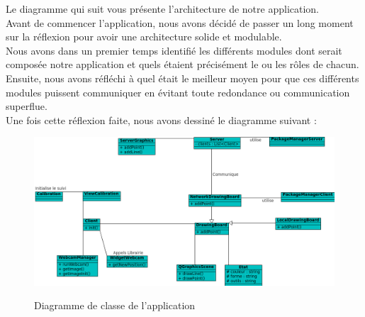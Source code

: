 \documentclass{report}
\begin{document}
				\newpage			
				Le diagramme qui suit vous présente l'architecture de notre application. \\
Avant de commencer l'application, nous avons décidé de passer un long moment sur la réflexion pour avoir une architecture solide et modulable.\\Nous avons dans un premier temps identifié les différents modules dont serait composée notre application et quels étaient précisément le ou les rôles de chacun. \\Ensuite, nous avons réfléchi à quel était le meilleur moyen pour que ces différents modules puissent communiquer en évitant toute redondance ou communication superflue. \\Une fois cette réflexion faite, nous avons dessiné le diagramme suivant : \\
				\begin{figure}[!h]
						\centering
						\includegraphics[scale=0.6]{../uml/classes.png}\\
						\caption{Diagramme de classe de l'application}
						\label{Diagramme de classe de l'application}
				\end{figure}
				
\end{document}
